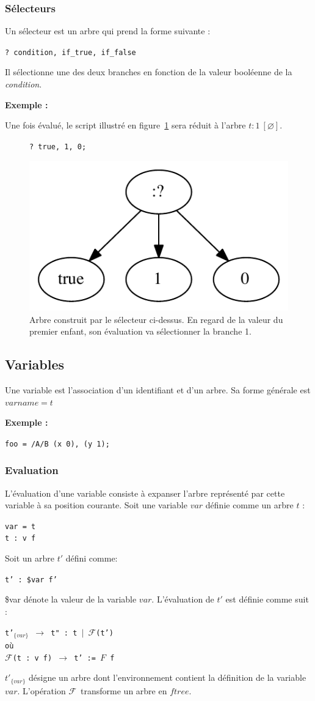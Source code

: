 \documentclass{article}
\newcommand{\exemple}	{\vspace*{1mm}\hspace*{-4mm}\textbf{Exemple :}}
\newcommand{\code}	[2][0.9]		{\vspace{0mm}\begin{center}\colorbox{mygrey}{
							\begin{minipage}[t]{#1\columnwidth} 
							{\small \texttt{#2}}
							\end{minipage}}\end{center}}
\newcommand{\op}	[1]		{\vspace{0mm}\begin{center}\colorbox{mygrey}{
							\begin{minipage}[t]{0.9\columnwidth} 
							{\small \texttt{#1}}
							\end{minipage}}\end{center}}
\newcommand{\nulltree}	{\ensuremath{\varnothing}}
\newcommand{\seq}		{\ensuremath{|}}
\newcommand{\foret}		{\ensuremath{F}}
\newcommand{\toforet}	{\ensuremath{\mathcal{F}}}
\begin{document}
\subsubsection{Sélecteurs}

Un sélecteur est un arbre qui prend la forme suivante :
\code{? condition, if\_true, if\_false}
Il sélectionne une des deux branches en fonction de la valeur booléenne de la \emph{condition}.

\exemple

Une fois évalué, le script illustré en figure~\ref{dotselect} sera réduit à l'arbre $t : 1\ [\nulltree]$.

\begin{figure}[htbp]
\code{? true, 1, 0;}
\begin{center}
\includegraphics[width=0.5\columnwidth]{tree/select}
\caption{Arbre construit par le sélecteur ci-dessus. En regard de la valeur du premier enfant, son évaluation va sélectionner la branche 1.}
\label{dotselect}
\end{center}
\end{figure}



\subsection{Variables}

Une variable est l’association d'un identifiant et d’un arbre. Sa forme générale est 
$varname = t$

\exemple
\code{foo = /A/B (x 0), (y 1); }

\subsubsection{Evaluation}

L'évaluation d'une variable consiste à expanser l'arbre représenté par cette variable à sa position courante.
Soit une variable $var$ définie comme un arbre $t$ :
\op{var = t \\
t :  v f
}
Soit un arbre $t'$ défini comme:
\op{t' :  \$var f'
}
\$var dénote la valeur de la variable $var$. 
L'évaluation de $t'$ est définie comme suit :
\op{t'$_{\{var\}}$ $\to$ t" : t \seq\ \toforet(t') \\
où \\
\toforet(t : v f) $\to$ t' := \foret\ f
}
$t'_{\{var\}}$ désigne un arbre dont l'environnement contient la définition de la variable $var$. L'opération \toforet\ transforme un arbre en $ftree$.
\end{document}

